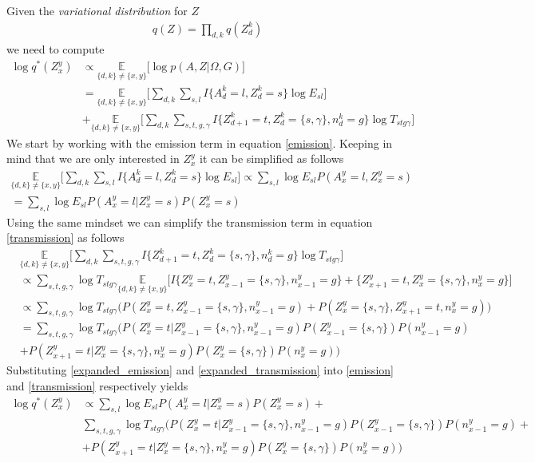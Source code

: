 Given the \textit{variational distribution} for $Z$
\begin{align}
  q(Z) = \prod_{d,k} q(Z_d^k)
\end{align}
we need to compute
\begin{align}
  \log q^*(Z_x^y) & \propto \underset{\{d,k\} \neq \{x,y\}}{\mathbb{E}} \bigg[ \log p(A,Z|\Omega, G) \bigg] \nonumber \\
  & = \underset{\{d,k\} \neq \{x,y\}}{\mathbb{E}} \bigg[\sum_{d,k}\sum_{s,l} I\{A_d^k=l, Z_d^k=s\} \log E_{sl} \bigg] \label{emission} \\
      & + \underset{\{d,k\} \neq \{x,y\}}{\mathbb{E}} \bigg[ \sum_{d,k}\sum_{s,t,g,\gamma} I\{Z_{d+1}^k = t, Z_d^k = \{s,\gamma\}, n_d^k = g\} \log T_{stg\gamma} \bigg] \label{transmission}
\end{align}
We start by working with the emission term in equation \eqref{emission}. Keeping in mind that we are only interested in $Z_x^y$ it can be simplified as follows
\begin{align}
  \underset{\{d,k\} \neq \{x,y\}}{\mathbb{E}} \bigg[\sum_{d,k}\sum_{s,l} I\{A_d^k=l, Z_d^k=s\} \log E_{sl} \bigg] \propto
  \sum_{s,l} \log E_{sl} P(A_x^y=l, Z_x^y=s) \nonumber \\
  = \sum_{s,l} \log E_{sl} P(A_x^y=l | Z_x^y=s)P(Z_x^y=s)
  \label{expanded_emission}
\end{align}
Using the same mindset we can simplify the transmission term in equation \eqref{transmission} as follows
\begin{align}
  & \underset{\{d,k\} \neq \{x,y\}}{\mathbb{E}} \bigg[ \sum_{d,k}\sum_{s,t,g,\gamma} I\{Z_{d+1}^k = t, Z_d^k = \{s,\gamma\}, n_d^k = g\} \log T_{stg\gamma} \bigg] \nonumber\\
  & \propto \sum_{s,t,g,\gamma} \log T_{stg\gamma} \underset{\{d,k\} \neq \{x,y\}}{\mathbb{E}} \bigg[
  I\{Z_{x}^y = t, Z_{x-1}^y = \{s,\gamma\}, n_{x-1}^y = g\} + \{Z_{x+1}^y = t, Z_x^y = \{s,\gamma\}, n_x^y = g\}\bigg] \nonumber \\
  & \propto \sum_{s,t,g,\gamma} \log T_{stg\gamma} \bigg( P(Z_x^y = t, Z_{x-1}^y = \{s,\gamma\}, n_{x-1}^y = g)
  + P(Z_x^y = \{s,\gamma\}, Z_{x+1}^y = t, n_x^y = g) \bigg) \nonumber \\
  & = \sum_{s,t,g,\gamma} \log T_{stg\gamma} \bigg( P(Z_x^y = t| Z_{x-1}^y = \{s,\gamma\}, n_{x-1}^y = g)P(Z_{x-1}^y = \{s,\gamma\})P(n_{x-1}^y = g) \nonumber\\
  & + P(Z_{x+1}^y = t| Z_x^y = \{s,\gamma\}, n_x^y = g)P(Z_x^y = \{s,\gamma\})P(n_x^y = g) \bigg)
  \label{expanded_transmission}
\end{align}
Substituting \eqref{expanded_emission} and \eqref{expanded_transmission} into \eqref{emission} and \eqref{transmission} respectively yields
\begin{align}
  \log q^*(Z_x^y) & \propto \sum_{s,l} \log E_{sl} P(A_x^y=l | Z_x^y=s)P(Z_x^y=s) + \\
  & \sum_{s,t,g,\gamma} \log T_{stg\gamma} \bigg( P(Z_x^y = t| Z_{x-1}^y = \{s,\gamma\}, n_{x-1}^y = g)P(Z_{x-1}^y = \{s,\gamma\})P(n_{x-1}^y = g) + \nonumber\\
  & + P(Z_{x+1}^y = t| Z_x^y = \{s,\gamma\}, n_x^y = g)P(Z_x^y = \{s,\gamma\})P(n_x^y = g) \bigg)
\end{align}
